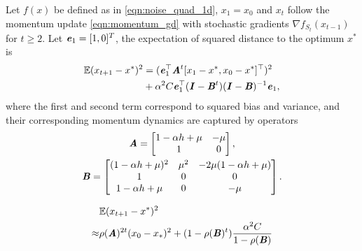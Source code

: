 \begin{lemma}
\label{lem:main_lemma}
Let $f(x)$ be defined as in \eqref{eqn:noise_quad_1d},
$x_1=x_0$ and $x_t$ follow the momentum update \eqref{eqn:momentum_gd} with stochastic gradients $\nabla f_{S_t}(x_{t-1})$ for $t \geq 2$.
Let $\bm{\mathit{e}}_1=[1, 0]^T$, the expectation of squared distance to the optimum $x^*$ is
	\begin{equation}
	\begin{aligned}
		\mathbb{E} (x_{t+1} - x^{*})^2 & = (\bm{\mathit{e}}^{\top}_1 \bm{\mathit{A}}^t [x_1 - x^{*}, x_0-x^{*}]^{\top})^2 \\
		& + \alpha^2 C \bm{\mathit{e}}^{\top}_1 (\bm{\mathit{I}} - \bm{\mathit{B}}^t)(\bm{\mathit{I}} - \bm{\mathit{B}})^{-1}\bm{\mathit{e}}_1	,
		\label{equ:squared_dist_exact}	
	\end{aligned}
	\end{equation}
where the first and second term correspond to squared bias 
and variance, and their corresponding momentum dynamics are captured by operators
	\begin{equation}
	\begin{gathered}
		\bm{\mathit{A}} = \begin{bmatrix}
		1-\alpha h + \mu & - \mu\\
		1 & 0 \\
		\end{bmatrix}, \\
		\bm{\mathit{B}} = 
		\begin{bmatrix}
		(1-\alpha h + \mu)^2 &  \mu^2 & -2\mu(1-\alpha h + \mu)\\
		1 & 0 & 0 \\
		1-\alpha h + \mu & 0 & - \mu
		\end{bmatrix}.
		\label{equ:mat_def}
	\end{gathered}
	\end{equation}
\end{lemma}

\begin{equation}
\begin{aligned}
	&\mathbb{E} ( x_{t+1} - x^{*} )^2 \\
	\approx & \rho(\bm{\mathit{A}})^{2t} ( x_0 - x_{*} )^2 
		+ (1-\rho(\bm{\mathit{B}})^{t}) \frac{\alpha^2 C}{1-\rho(\bm{\mathit{B}})}
	\label{eqn:asymptotic_surrogate}
\end{aligned}
\end{equation}

